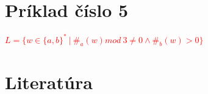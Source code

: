 \documentclass[11pt,a4paper]{article}
\newcommand{\red}[1]{\textcolor{red}{#1}}
\begin{document}
\section{Príklad číslo 5}
\red{$L = \{ w \in \{a,b\}^*\ |\ \#_a(w)mod\ 3 \neq 0 \wedge \#_b(w) > 0\}$}
\newpage

\section{Literatúra}

\begin{flushleft}
    
\end{flushleft}
\end{document}
